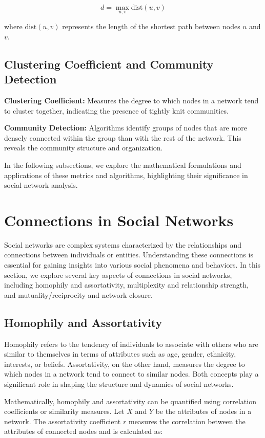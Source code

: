 \documentclass[12pt]{book} %
\begin{document}
\[ d = \max_{u,v} \text{dist}(u,v) \]

where \(\text{dist}(u,v)\) represents the length of the shortest path between nodes \(u\) and \(v\).

\subsection{Clustering Coefficient and Community Detection}

\textbf{Clustering Coefficient:} Measures the degree to which nodes in a network tend to cluster together, indicating the presence of tightly knit communities.

\textbf{Community Detection:} Algorithms identify groups of nodes that are more densely connected within the group than with the rest of the network. This reveals the community structure and organization.

In the following subsections, we explore the mathematical formulations and applications of these metrics and algorithms, highlighting their significance in social network analysis.



\section{Connections in Social Networks}

Social networks are complex systems characterized by the relationships and connections between individuals or entities. Understanding these connections is essential for gaining insights into various social phenomena and behaviors. In this section, we explore several key aspects of connections in social networks, including homophily and assortativity, multiplexity and relationship strength, and mutuality/reciprocity and network closure.

\subsection{Homophily and Assortativity}

Homophily refers to the tendency of individuals to associate with others who are similar to themselves in terms of attributes such as age, gender, ethnicity, interests, or beliefs. Assortativity, on the other hand, measures the degree to which nodes in a network tend to connect to similar nodes. Both concepts play a significant role in shaping the structure and dynamics of social networks.

Mathematically, homophily and assortativity can be quantified using correlation coefficients or similarity measures. Let \(X\) and \(Y\) be the attributes of nodes in a network. The assortativity coefficient \(r\) measures the correlation between the attributes of connected nodes and is calculated as:
\end{document}
